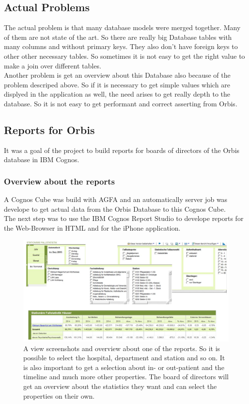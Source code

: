 \documentclass[a4paper]{article}
\begin{document}
	\subsection{Actual Problems}
	The actual problem is that many database models were merged together. Many of
	them are not state of the art. So there are really big Database tables with
	many columns and without primary keys. They also don't have foreign keys to
	other other necessary tables. So sometimes it is not easy to get the right
	value to make a join over different tables.\\
	Another problem is get an overview about this Database also because of the
	problem descriped above. So if it is necessary to get simple values
	which are displyed in the application as well, the need arises to get really
	depth to the database. So it is not easy to get performant and correct
	asserting from Orbis.
	\subsection{Reports for Orbis}
	It was a goal of the project to build reports for boards of directors of the
	Orbis database in IBM Cognos. 
	\subsubsection{Overview about the reports}
	A Cognos Cube was build with AGFA and an automatically server job was develope
	to get actual data from the Orbis Database to this Cognos Cube.\\
	The next step was to use the IBM Cognos Report Studio to develope reports for
	the Web-Browser in HTML and for the iPhone application.
	\begin{figure}[!ht]
		  \centering
		      \includegraphics[width=1.0\textwidth]{reports_overview}
		  \caption{A view screenshots and overview about one of the reports. So it is
		  possible to select the hospital, department and station and so on. It is
		  also important to get a selection about in- or out-patient and the
		  timeline and much more other properties. The board of directors will get an
		  overview about the statistics they want and can select the properties on
		  their own.}
	\end{figure}
\end{document}

